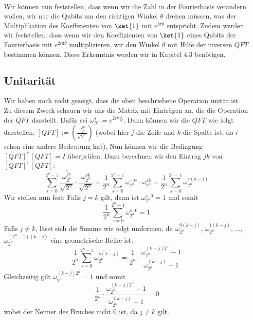 \paragraph{}

\noindent Wir können nun feststellen, dass wenn wir die Zahl in der Fourierbasis verändern wollen, wir nur die Qubits um den richtigen Winkel $\theta$ drehen müssen, was der Multiplikation des Koeffizienten von $\ket{1}$ mit $e^{i\pi\theta}$ entspricht. Zudem werden wir feststellen, dass wenn wir den Koeffizienten von $\ket{1}$ eines Qubits der Fourierbasis mit $e^{2i\pi\theta}$ multiplizieren, wir den Winkel $\theta$ mit Hilfe der inversen $QFT$ bestimmen können. Diese Erkenntnis werden wir in Kapitel 4.3 benötigen.

\subsection{Unitarität}
Wir haben noch nicht gezeigt, dass die oben beschriebene Operation unitär ist. Zu diesem Zweck schauen wir uns die Matrix mit Einträgen an, die die Operation der $QFT$ darstellt. Dafür sei $\omega_N^{s} := e^{2i\pi\frac{s}{N}}$. Dann können wir die $QFT$ wie folgt darstellen: $[QFT] := (\frac{\omega_{2^n}^{jk}}{\sqrt{2^n}})$ (wobei hier $j$ die Zeile und $k$ die Spalte ist, da $i$ schon eine andere Bedeutung hat). Nun können wir die Bedingung $[QFT]^{\dagger}\, [QFT] = I$ überprüfen. Dazu berechnen wir den Eintrag $jk$ von $[QFT]^{\dagger}\, [QFT]$:
$$\sum_{s = 0}^{2^n - 1}\frac{\overline{\omega_{2^n}^{js}}}{\sqrt{2^n}} \cdot \frac{\omega_{2^n}^{sk}}{\sqrt{2^n}} = \frac{1}{2^n}\sum_{s = 0}^{2^n - 1}\omega_{2^n}^{-js} \cdot \omega_{2^n}^{sk} = \frac{1}{2^n}\sum_{s = 0}^{2^n - 1}\omega_{2^n}^{s(k - j)}$$
Wir stellen nun fest: Falls $j = k$ gilt, dann ist $\omega_{2^n}^{s\cdot 0} = 1$ und somit 
$$\frac{1}{2^n}\sum_{s = 0}^{2^n - 1}\omega_{2^n}^{s\cdot 0} = 1$$
Falls $j \neq k$, lässt sich die Summe wie folgt umformen, da $\omega_{2^n}^{0(k - j)}$, $\omega_{2^n}^{1(k - j)}$, ..., $\omega_{2^n}^{(2^n - 1)(k - j)}$ eine geometrische Reihe ist:
$$\frac{1}{2^n}\sum_{s = 0}^{2^n - 1}\omega_{2^n}^{s(k - j)} = \frac{1}{2^n} \cdot \frac{\omega_{2^n}^{(k - j)2^n} - 1}{\omega_{2^n}^{(k - j)} - 1}$$
Gleichzeitig gilt $\omega_{2^n}^{(k - j)2^n} = 1$ und somit 
$$\frac{1}{2^n} \cdot \frac{\omega_{2^n}^{(k - j)2^n} - 1}{\omega_{2^n}^{(k - j)} - 1} = 0$$
wobei der Nenner des Bruches nicht $0$ ist, da $j \neq k$ gilt.

\paragraph{}

